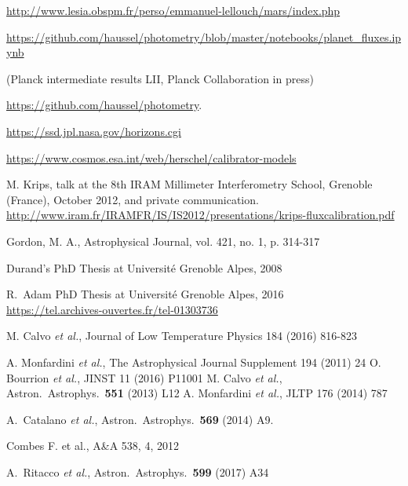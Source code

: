 \begin{thebibliography}{99}
\url{http://www.lesia.obspm.fr/perso/emmanuel-lellouch/mars/index.php}

\url{https://github.com/haussel/photometry/blob/master/notebooks/planet_fluxes.ipynb}

(Planck intermediate results LII, Planck
Collaboration in press)

\url{https://github.com/haussel/photometry}.

\url{https://ssd.jpl.nasa.gov/horizons.cgi}

\url{https://www.cosmos.esa.int/web/herschel/calibrator-models}

 M. Krips, talk at the 8th 
IRAM Millimeter Interferometry School, Grenoble (France),  October 2012, and
private communication.\\
\url{http://www.iram.fr/IRAMFR/IS/IS2012/presentations/krips-fluxcalibration.pdf}

 Gordon, M. A., Astrophysical Journal, vol. 421, no. 1, p. 314-317

 Durand's PhD Thesis at
Universit\'e Grenoble Alpes, 2008

 R.~Adam PhD Thesis at
  Universit\'e Grenoble Alpes, 2016\\
\url{https://tel.archives-ouvertes.fr/tel-01303736}

M. Calvo {\it et al.},  
Journal of Low Temperature Physics 184 (2016) 816-823 
 
    A. Monfardini {\it et al.}, The Astrophysical Journal Supplement 194 (2011)  24 
    O. Bourrion {\it et al.}, JINST 11 (2016) P11001 
    M. Calvo {\it et al.}, Astron.\ Astrophys.\  {\bf 551} (2013) L12
 A. Monfardini {\it et al.}, JLTP 176 (2014) 787
    
 
  A.~Catalano {\it et al.},
  Astron.\ Astrophys.\  {\bf 569} (2014) A9.
  
 Combes F. et al., A\&A 538, 4, 2012
  
 
  A.~Ritacco {\it et al.},
  Astron.\ Astrophys.\  {\bf 599} (2017) A34
  

\end{thebibliography}
